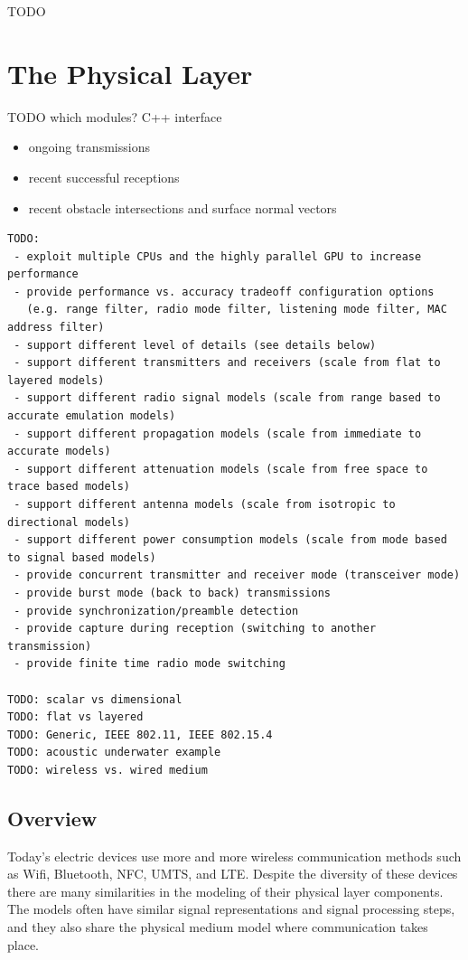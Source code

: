 \ifdraft TODO

\chapter{The Physical Layer}
\label{cha:physicallayer}

TODO which modules? C++ interface

\begin{itemize}
  \item ongoing transmissions
  \item recent successful receptions
  \item recent obstacle intersections and surface normal vectors
\end{itemize}

\begin{verbatim}
TODO: 
 - exploit multiple CPUs and the highly parallel GPU to increase performance
 - provide performance vs. accuracy tradeoff configuration options
   (e.g. range filter, radio mode filter, listening mode filter, MAC address filter)
 - support different level of details (see details below)
 - support different transmitters and receivers (scale from flat to layered models)
 - support different radio signal models (scale from range based to accurate emulation models)
 - support different propagation models (scale from immediate to accurate models)
 - support different attenuation models (scale from free space to trace based models)
 - support different antenna models (scale from isotropic to directional models)
 - support different power consumption models (scale from mode based to signal based models)
 - provide concurrent transmitter and receiver mode (transceiver mode)
 - provide burst mode (back to back) transmissions
 - provide synchronization/preamble detection
 - provide capture during reception (switching to another transmission)
 - provide finite time radio mode switching

TODO: scalar vs dimensional
TODO: flat vs layered
TODO: Generic, IEEE 802.11, IEEE 802.15.4
TODO: acoustic underwater example
TODO: wireless vs. wired medium

\end{verbatim}

\section{Overview}

Today's electric devices use more and more wireless communication methods such
as Wifi, Bluetooth, NFC, UMTS, and LTE. Despite the diversity of these devices
there are many similarities in the modeling of their physical layer components.
The models often have similar signal representations and signal processing steps,
and they also share the physical medium model where communication takes place.

